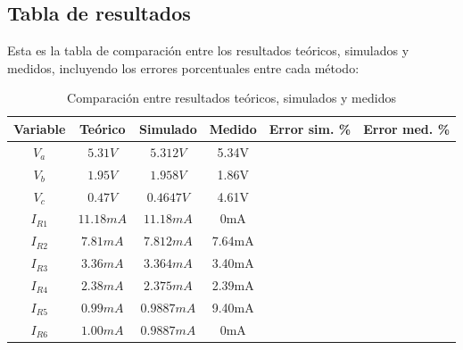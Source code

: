 \documentclass[conference]{IEEEtran}
\begin{document}
\subsection{Tabla de resultados}
Esta es la tabla de comparación entre los resultados teóricos, simulados y medidos, incluyendo los errores porcentuales entre cada método:
\begin{table}[h]
\centering
\caption{Comparación entre resultados teóricos, simulados y medidos}
\begin{tabular}{|c|c|c|c|c|c|}
\hline
\textbf{Variable} & \textbf{Teórico} & \textbf{Simulado} & \textbf{Medido} & \textbf{Error sim. \%} & \textbf{Error med. \%} \\
\hline
$V_a$ & $5.31V$ & $5.312V$ & 5.34V & & \\
\hline
$V_b$ & $1.95V$ & $1.958V$ & 1.86V & & \\
\hline
$V_c$ & $0.47V$ & $0.4647V$ & 4.61V & & \\
\hline
$I_{R1}$ & $11.18mA$ & $11.18mA$ & 0mA & & \\
\hline
$I_{R2}$ & $7.81mA$ & $7.812mA$ & 7.64mA & & \\
\hline
$I_{R3}$ & $3.36mA$ & $3.364mA$ & 3.40mA & & \\
\hline
$I_{R4}$ & $2.38mA$ & $2.375mA$ & 2.39mA & & \\
\hline
$I_{R5}$ & $0.99mA$ & $0.9887mA$ & 9.40mA & & \\
\hline
$I_{R6}$ & $1.00mA$ & $0.9887mA$ & 0mA & & \\
\hline
\end{tabular}
\end{table}
\end{document}
